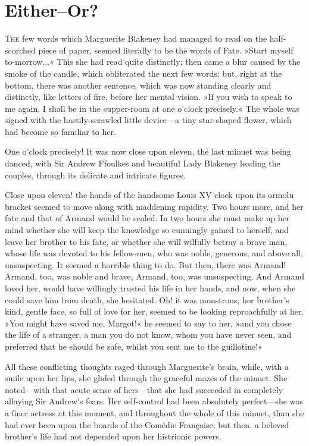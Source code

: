 
\chapter[Either\allowbreak---\allowbreak Or?]{Either–Or?}
\lettrine[lines=4]{T}{he} few words which Marguerite Blakeney had managed to read on the half-scorched piece of paper, seemed literally to be the words of Fate. »Start myself to-morrow...« This she had read quite distinctly; then came a blur caused by the smoke of the candle, which obliterated the next few words; but, right at the bottom, there was another sentence, which was now standing clearly and distinctly, like letters of fire, before her mental vision. »If you wish to speak to me again, I shall be in the supper-room at one o'clock precisely.« The whole was signed with the hastily-scrawled little device\allowbreak---\allowbreak a tiny star-shaped flower, which had become so familiar to her.

One o'clock precisely! It was now close upon eleven, the last minuet was being danced, with Sir Andrew Ffoulkes and beautiful Lady Blakeney leading the couples, through its delicate and intricate figures.

Close upon eleven! the hands of the handsome Louis XV clock upon its ormolu bracket seemed to move along with maddening rapidity. Two hours more, and her fate and that of Armand would be sealed. In two hours she must make up her mind whether she will keep the knowledge so cunningly gained to herself, and leave her brother to his fate, or whether she will wilfully betray a brave man, whose life was devoted to his fellow-men, who was noble, generous, and above all, unsuspecting. It seemed a horrible thing to do. But then, there was Armand! Armand, too, was noble and brave, Armand, too, was unsuspecting. And Armand loved her, would have willingly trusted his life in her hands, and now, when she could save him from death, she hesitated. Oh! it was monstrous; her brother's kind, gentle face, so full of love for her, seemed to be looking reproachfully at her. »You might have saved me, Margot!« he seemed to say to her, »and you chose the life of a stranger, a man you do not know, whom you have never seen, and preferred that he should be safe, whilst you sent me to the guillotine!«

All these conflicting thoughts raged through Marguerite's brain, while, with a smile upon her lips, she glided through the graceful mazes of the minuet. She noted\allowbreak---\allowbreak with that acute sense of hers\allowbreak---\allowbreak that she had succeeded in completely allaying Sir Andrew's fears. Her self-control had been absolutely perfect\allowbreak---\allowbreak she was a finer actress at this moment, and throughout the whole of this minuet, than she had ever been upon the boards of the Comédie Française; but then, a beloved brother's life had not depended upon her histrionic powers.

